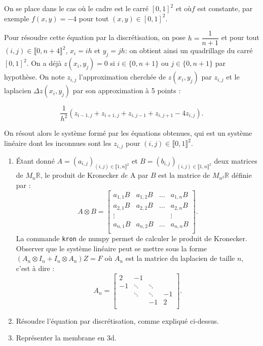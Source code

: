 \documentclass[10pt,fleqn]{article} %
\begin{document}
\begin{multicols}{2}
 On se place dans le cas où le cadre est le carré $[0,1]^2$ et où$f$ est constante, par exemple $f(x,y)=-4$ pour tout $(x,y)\in[0,1]^2$. 
 
 Pour résoudre cette équation par la discrétisation, on pose $h=\dfrac{1}{n+1}$ et pour tout $(i,j)\in \llbracket 0,n+4 \rrbracket^2$, $x_i=ih$ et $y_j=jh$: on obtient ainsi un quadrillage du carré $[0,1]^2$. On a déjà $z\left(x_i,y_j\right)=0$  si $i\in \{0,n+1\}$ ou $j \in \{0,n+1\}$ par hypothèse. On note $z_{i,j}$ l'approximation cherchée de $z\left(x_i,y_j\right)$ par $z_{i,j}$ et le laplacien $\Delta z\left(x_i,y_j\right)$ par son approximation à 5 points : 
 
 $$
 \dfrac{1}{h^2}\left( z_{i-1,j}+z_{i+1,j}+z_{i,j-1}+z_{i,j+1}-4z_{i,j}\right).
 $$
 
 On résout alors le système formé par les équations obtenues, qui est un système linéaire dont les inconnues sont les $z_{i,j}$ pour $(i,j)\in 
  \llbracket 0,1 \rrbracket^2$.
\begin{enumerate}
\item Étant donné $A=\left(a_{i,j}\right)_{(i,j)\in\llbracket 1,n \rrbracket^2 }$ et $B=\left(b_{i,j}\right)_{(i,j)\in\llbracket 1,n \rrbracket^2 }$ deux matrices de $M_n\mathbb{R}$, le produit de Kronecker $de$ A par $B$ est la matrice de $M_{n^2}\mathbb{R}$ définie par :
$$
A\otimes B = 
\begin{bmatrix}
a_{1,1}B & a_{1,2}B & \ldots & a_{1,n}B \\
a_{2,1}B & a_{2,2}B & \ldots & a_{2,n}B \\
\vdots  & & & \vdots  \\
a_{n,1}B & a_{n,2}B & \ldots & a_{n,n}B \\
\end{bmatrix} .
$$
La commande \texttt{kron} de numpy permet de calculer le produit de Kronecker. Observer que le système linéaire peut se mettre sous la forme $\left(A_n\otimes I_n+ I_n\otimes A_n\right)Z=F$ où $A_n$ est la matrice du laplacien de taille $n$, c'est à dire : 
$$
A_n = 
\begin{bmatrix}
2  & -1 & & \\
-1 & \ddots & \ddots & \\
   & \ddots &\ddots & -1\\
   &  & -1& 2\\
\end{bmatrix} .
$$
\item Résoudre l'équation par discrétisation, comme expliqué ci-dessus.
\item Représenter la membrane en 3d.
\end{enumerate}  



\end{multicols}
\end{document}
